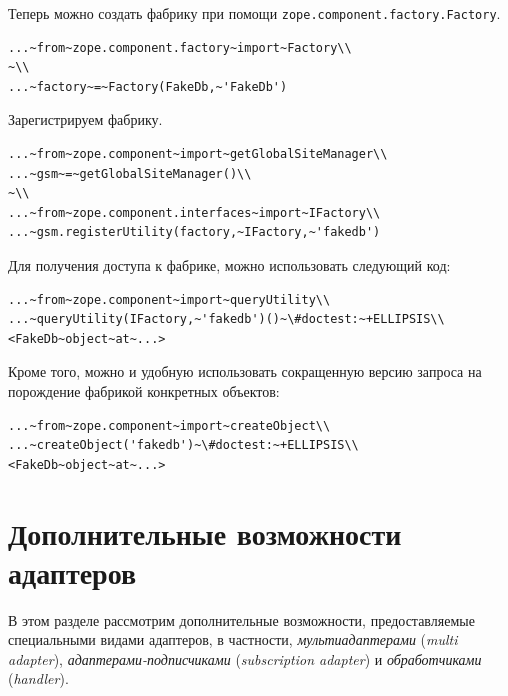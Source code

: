\documentclass[a4paper,openany,twoside,draft]{book}
\providecommand*{\DUroletitlereference}[1]{\textsl{#1}}
\begin{document}
Теперь можно создать фабрику при помощи
\texttt{zope.component.factory.Factory}.

\begin{verbatim}
...~from~zope.component.factory~import~Factory\\
~\\
...~factory~=~Factory(FakeDb,~'FakeDb')
\end{verbatim}

Зарегистрируем фабрику.

\begin{verbatim}
...~from~zope.component~import~getGlobalSiteManager\\
...~gsm~=~getGlobalSiteManager()\\
~\\
...~from~zope.component.interfaces~import~IFactory\\
...~gsm.registerUtility(factory,~IFactory,~'fakedb')
\end{verbatim}

Для получения доступа к фабрике, можно использовать следующий код:

\begin{verbatim}
...~from~zope.component~import~queryUtility\\
...~queryUtility(IFactory,~'fakedb')()~\#doctest:~+ELLIPSIS\\
<FakeDb~object~at~...>
\end{verbatim}

Кроме того, можно и удобную использовать сокращенную версию запроса на
порождение фабрикой конкретных объектов:

\begin{verbatim}
...~from~zope.component~import~createObject\\
...~createObject('fakedb')~\#doctest:~+ELLIPSIS\\
<FakeDb~object~at~...>
\end{verbatim}


\chapter{Дополнительные возможности адаптеров%
  \label{id44}%
}

В этом разделе рассмотрим дополнительные возможности, предоставляемые
специальными видами адаптеров, в частности, \DUroletitlereference{мультиадаптерами} (\DUroletitlereference{multi
adapter}), \DUroletitlereference{адаптерами-подписчиками} (\DUroletitlereference{subscription adapter}) и
\DUroletitlereference{обработчиками} (\DUroletitlereference{handler}).
\end{document}
